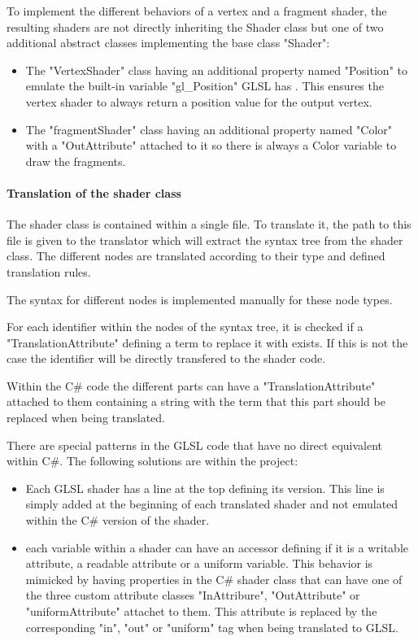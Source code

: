 To implement the different behaviors of a vertex and a fragment shader, the resulting shaders are not directly inheriting the Shader class but one of two additional abstract classes implementing the base class "Shader":
\begin{itemize}
\item The "VertexShader" class having an additional property named "Position" to emulate the built-in variable "gl\_Position" GLSL has . This ensures the vertex shader to always return a position value for the output vertex.
\item The "fragmentShader" class having an additional property named "Color" with a "OutAttribute" attached to it so there is always a Color variable to draw the fragments.
\end{itemize}

\paragraph{Translation of the shader class}

The shader class is contained within a single file. To translate it, the path to this file is given to the translator which will extract the syntax tree from the shader class. The different nodes are translated according to their type and defined translation rules.

The syntax for different nodes is implemented manually for these node types.

For each identifier within the nodes of the syntax tree, it is checked if a "TranslationAttribute" defining a term to replace it with exists. If this is not the case the identifier will be directly transfered to the shader code.

Within the C\# code the different parts can have a "TranslationAttribute" attached to them containing a string with the term that this part should be replaced when being translated.

There are special patterns in the GLSL code that have no direct equivalent within C\#. The following solutions are within the project:
\begin{itemize}
\item Each GLSL shader has a line at the top defining its version. This line is simply added at the beginning of each translated shader and not emulated within the C\# version of the shader.
\item each variable within a shader can have an accessor defining if it is a writable attribute, a readable attribute or a uniform variable. This behavior is mimicked by having properties in the C\# shader class that can have one of the three custom attribute classes "InAttribure", "OutAttribute" or "uniformAttribute" attachet to them. This attribute is replaced by the corresponding "in", "out" or "uniform" tag when being translated to GLSL.
\end{itemize}

